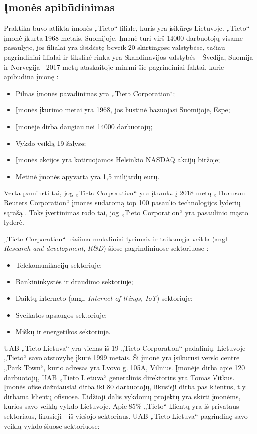 \documentclass{VUMIFPSbakalaurinis}
\begin{document}
\subsection{Įmonės apibūdinimas}
Praktika buvo atlikta įmonės „Tieto“ filiale, kuris yra įsikūręs Lietuvoje. „Tieto“ įmonė įkurta 1968 metais, Suomijoje. Įmonė turi virš 14000 darbuotojų visame pasaulyje, jos filialai yra išsidėstę beveik 20 skirtingose valstybėse, tačiau pagrindiniai filialai ir tikslinė rinka yra Skandinavijos valstybės - Švedija, Suomija ir Norvegija \cite{TIETO}. 2017 metų ataskaitoje minimi šie pagrindiniai faktai, kurie apibūdina įmonę \cite{TIETO}:
\begin{itemize}
    \item Pilnas įmonės pavadinimas yra „Tieto Corporation“;
    \item Įmonės įkūrimo metai yra 1968, jos būstinė bazuojasi Suomijoje, Espe;
    \item Įmonėje dirba daugiau nei 14000 darbuotojų;
    \item Vykdo veiklą 19 šalyse;
    \item Įmonės akcijos yra kotiruojamos Helsinkio NASDAQ akcijų biržoje;
    \item Metinė įmonės apyvarta yra 1,5 milijardų eurų.
\end{itemize}

Verta paminėti tai, jog  „Tieto Corporation“ yra įtrauka į 2018 metų „Thomson Reuters Corporation“ įmonės sudaromą top 100 pasaulio technologijos lyderių sąrašą \cite{List}. Toks įvertinimas rodo tai, jog „Tieto Corporation“ yra pasaulinio mąsto lyderė.

„Tieto Corporation“ užsiima moksliniai tyrimais ir taikomąja veikla (angl. \textit{Research and development, R&D}) šiose pagrindiniuose sektoriuose \cite{TIETO}:
\begin{itemize}
    \item Telekomunikacijų sektoriuje;
    \item Bankininkystės ir draudimo sektoriuje;
    \item Daiktų interneto (angl. \textit{Internet of things, IoT}) sektoriuje;
    \item Sveikatos apsaugos sektoriuje;
    \item Miškų ir energetikos sektoriuje.
\end{itemize}

UAB „Tieto Lietuva“ yra vienas iš 19 „Tieto Corporation“ padalinių. Lietuvoje „Tieto“ savo atstovybę įkūrė 1999 metais. Ši įmonė yra įsikūrusi verslo centre „Park Town“, kurio adresas yra Lvovo g. 105A, Vilnius. Įmonėje dirba apie 120 darbuotojų, UAB „Tieto Lietuva“ generalinis direktorius yra Tomas Vitkus. Įmonės ofise dažniausiai dirba iki 80 darbuotojų, likusieji dirba pas klientus, t.y. dirbama klientų ofisuose. Didžioji dalis vykdomų projektų yra skirti įmonėms, kurios savo veiklą vykdo Lietuvoje. Apie 85\% „Tieto“ klientų yra iš privataus sektoriaus, likusieji - iš viešojo sektoriaus. UAB „Tieto Lietuva“ pagrindinę savo veiklą vykdo šiuose sektoriuose: 
\end{document}
